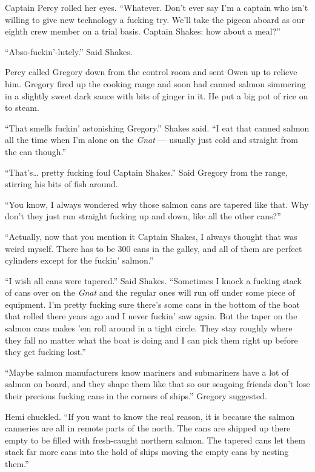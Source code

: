 \documentclass[
]{scrbook}
\begin{document}
Captain Percy rolled her eyes. ``Whatever. Don't ever say I'm a captain
who isn't willing to give new technology a fucking try. We'll take the
pigeon aboard as our eighth crew member on a trial basis. Captain
Shakes: how about a meal?''

``Abso-fuckin'-lutely.'' Said Shakes.

Percy called Gregory down from the control room and sent Owen up to
relieve him. Gregory fired up the cooking range and soon had canned
salmon simmering in a slightly sweet dark sauce with bits of ginger in
it. He put a big pot of rice on to steam.

``That smells fuckin' astonishing Gregory.'' Shakes said. ``I eat that
canned salmon all the time when I'm alone on the \emph{Gnat} --- usually
just cold and straight from the can though.''

``That's\ldots{} pretty fucking foul Captain Shakes.'' Said Gregory from
the range, stirring his bits of fish around.

``You know, I always wondered why those salmon cans are tapered like
that. Why don't they just run straight fucking up and down, like all the
other cans?''

``Actually, now that you mention it Captain Shakes, I always thought
that was weird myself. There has to be 300 cans in the galley, and all
of them are perfect cylinders except for the fuckin' salmon.''

``I wish all cans were tapered.'' Said Shakes. ``Sometimes I knock a
fucking stack of cans over on the \emph{Gnat} and the regular ones will
run off under some piece of equipment. I'm pretty fucking sure there's
some cans in the bottom of the boat that rolled there years ago and I
never fuckin' saw again. But the taper on the salmon cans makes 'em roll
around in a tight circle. They stay roughly where they fall no matter
what the boat is doing and I can pick them right up before they get
fucking lost.''

``Maybe salmon manufacturers know mariners and submariners have a lot of
salmon on board, and they shape them like that so our seagoing friends
don't lose their precious fucking cans in the corners of ships.''
Gregory suggested.

Hemi chuckled. ``If you want to know the real reason, it is because the
salmon canneries are all in remote parts of the north. The cans are
shipped up there empty to be filled with fresh-caught northern salmon.
The tapered cans let them stack far more cans into the hold of ships
moving the empty cans by nesting them.''
\end{document}
